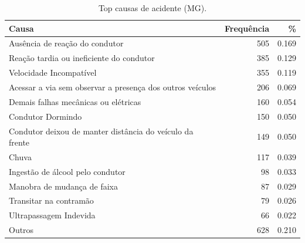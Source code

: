 \begin{table}
\caption{Top causas de acidente (MG).}
\label{tab:top_causas}
\begin{tabular}{lrr}
\toprule
Causa & Frequência & \% \\
\midrule
Ausência de reação do condutor & 505 & 0.169 \\
Reação tardia ou ineficiente do condutor & 385 & 0.129 \\
Velocidade Incompatível & 355 & 0.119 \\
Acessar a via sem observar a presença dos outros veículos & 206 & 0.069 \\
Demais falhas mecânicas ou elétricas & 160 & 0.054 \\
Condutor Dormindo & 150 & 0.050 \\
Condutor deixou de manter distância do veículo da frente & 149 & 0.050 \\
Chuva & 117 & 0.039 \\
Ingestão de álcool pelo condutor & 98 & 0.033 \\
Manobra de mudança de faixa & 87 & 0.029 \\
Transitar na contramão & 79 & 0.026 \\
Ultrapassagem Indevida & 66 & 0.022 \\
Outros & 628 & 0.210 \\
\bottomrule
\end{tabular}
\end{table}
